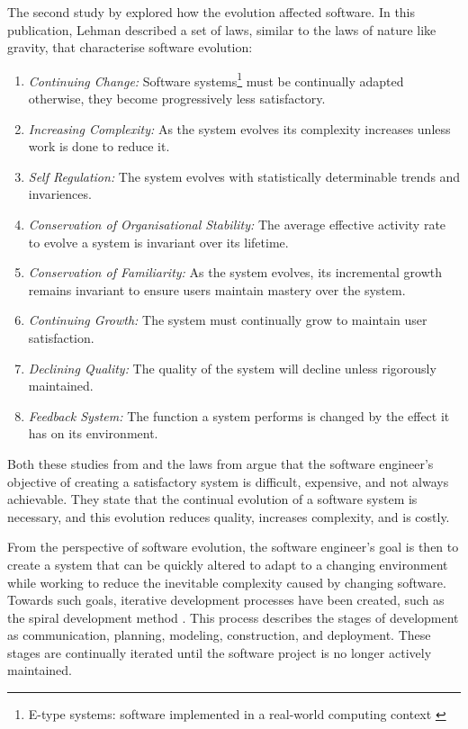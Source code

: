 The second study by \cite{lehman1980} explored how the evolution affected software.
In this publication, Lehman described a set of laws, similar to the laws of nature like gravity, that characterise software evolution:
\begin{enumerate}
  \item \textit{Continuing Change:} Software systems\footnote{E-type systems: software implemented in a real-world computing context \citep{lehman1980}} must be continually adapted 
  otherwise, they become progressively less satisfactory.
  \item \textit{Increasing Complexity:} As the system evolves its complexity increases unless work is done to reduce it.
  \item \textit{Self Regulation:} The system evolves with statistically determinable trends and invariences.
  \item \textit{Conservation of Organisational Stability:} The average effective activity rate to evolve a system is invariant over its lifetime.
  \item \textit{Conservation of Familiarity:} As the system evolves, its incremental growth remains invariant to ensure users maintain mastery over the system.
  \item \textit{Continuing Growth:} The system must continually grow to maintain user satisfaction.
  \item \textit{Declining Quality:} The quality of the system will decline unless rigorously maintained.
  \item \textit{Feedback System:} The function a system performs is changed by the effect it has on its environment.
\end{enumerate}

Both these studies from \cite{Lientz1980} and the laws from \citep{lehman1980} argue that
the software engineer's objective of creating a satisfactory system is difficult, expensive, and not always achievable.
They state that the continual evolution of a software system is necessary, and this evolution reduces quality, increases complexity, and is costly.

From the perspective of software evolution, the software engineer's goal is then to create a system that can be quickly altered to adapt to a changing environment 
while working to reduce the inevitable complexity caused by changing software.
Towards such goals, iterative development processes have been created, such as the spiral development method \citep{Boehm1988}.
This process describes the stages of development as communication, planning, modeling, construction, and deployment. 
These stages are continually iterated until the software project is no longer actively maintained. 

